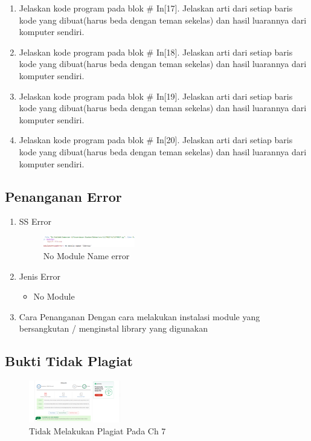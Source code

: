 \begin{enumerate}
\item Jelaskan kode program pada blok \# In[17]. Jelaskan arti dari setiap baris kode yang dibuat(harus beda dengan teman sekelas) dan hasil luarannya dari komputer sendiri.


\item Jelaskan kode program pada blok \# In[18]. Jelaskan arti dari setiap baris kode yang dibuat(harus beda dengan teman sekelas) dan hasil luarannya dari komputer sendiri.


\item Jelaskan kode program pada blok \# In[19]. Jelaskan arti dari setiap baris kode yang dibuat(harus beda dengan teman sekelas) dan hasil luarannya dari komputer sendiri.


\item Jelaskan kode program pada blok \# In[20]. Jelaskan arti dari setiap baris kode yang dibuat(harus beda dengan teman sekelas) dan hasil luarannya dari komputer sendiri.

\end{enumerate}
\subsection{Penanganan Error}
\begin{enumerate}
	\item SS Error
	\begin{figure}[H]
		\includegraphics[width=4cm]{figures/1164013/err/7_no_module.png}
		\centering
		\caption{No Module Name error}
	\end{figure}
	\item Jenis Error
	\begin{itemize}
		\item No Module
	\end{itemize}
	\item Cara Penanganan
	\hfill\break
	Dengan cara melakukan instalasi module yang bersangkutan / menginstal library yang digunakan
\end{enumerate}
\subsection{Bukti Tidak Plagiat}
\begin{figure}[H]
    \includegraphics[width=4cm]{figures/1164013/ve/7.png}
    \centering
    \caption{Tidak Melakukan Plagiat Pada Ch 7}
\end{figure}